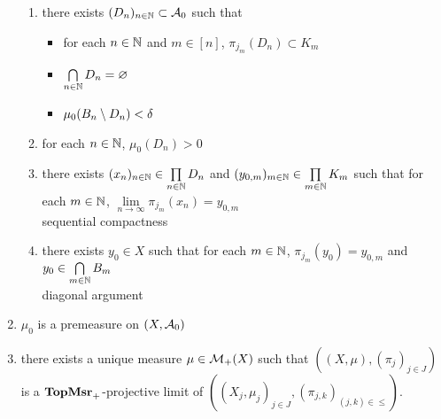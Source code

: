\documentclass{book}
\begin{document}
\begin{ex}
\begin{enumerate}
\begin{enumerate}
			\item there exists $(D_n)_{n \in \mathbb{N}} \subset \mathcal{A}_0$ such that 
			\begin{itemize}
				\item for each $n \in \mathbb{N}$ and $m \in [n]$, $\pi_{j_m}(D_n) \subset K_m$ 
				\item $\bigcap\limits_{n \in \mathbb{N}} D_n = \varnothing$
				\item $\mu_0(B_n \setminus D_n) < \delta$
			\end{itemize}
			\item for each $n \in \mathbb{N}$, $\mu_0(D_n) > 0$ 
			\item there exists $(x_n)_{n \in \mathbb{N}} \in \prod\limits_{n \in \mathbb{N}} D_n$ and $(y_{0, m})_{m \in \mathbb{N}} \in \prod\limits_{m \in \mathbb{N}} K_m$ such that for each $m \in \mathbb{N}$, $\lim\limits_{n \rightarrow \infty} \pi_{j_m}(x_n) = y_{0,m}$ \\
			 sequential compactness
			\item there exists $y_0 \in X$ such that for each $m \in \mathbb{N}$, $\pi_{j_m}(y_0) = y_{0,m}$ and $y_0 \in \bigcap\limits_{m \in \mathbb{N}} B_m$\\
			 diagonal argument 
		\end{enumerate}
		\item $\mu_0$ is a premeasure on $(X, \mathcal{A}_0)$\\
		  
		\item there exists a unique measure $\mu \in \mathcal{M}_+(X)$ such that $((X, \mu), (\pi_j)_{j \in J})$ is a $\operatorname*{\text{\textbf{TopMsr}}_{+}}$-projective limit of $((X_j, \mu_j)_{j \in J}, (\pi_{j,k})_{(j,k) \in {\leq}})$. 
	\end{enumerate}
\end{ex}
	
\end{document}
